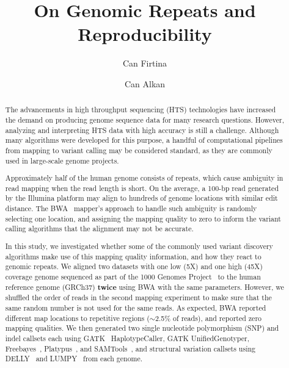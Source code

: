 \documentclass[a4paper]{article}
\date{}
\def\titulo#1{\title{#1}}
\begin{document}
\titulo{On Genomic Repeats and Reproducibility}

\author[1]{Can Firtina}
\author[1]{Can Alkan}

\maketitle
\thispagestyle{empty}


\begin{abstract}
The advancements in high throughput sequencing (HTS) technologies have increased the demand on producing  genome sequence data for many research questions. However, analyzing and interpreting HTS data with high accuracy is still a challenge. 
Although many algorithms were developed for this purpose, a handful of computational pipelines from mapping to variant calling may be considered standard, as they are commonly used in large-scale genome projects.

Approximately half of the human genome consists of repeats, which cause ambiguity in read mapping when the read length is short. On the average, a 100-bp read generated by the Illumina platform may align to hundreds of genome locations with similar edit distance. 
The BWA~\cite{Li2009a} mapper's  approach to handle such ambiguity is randomly selecting one location, and assigning the mapping quality to zero to inform the variant calling algorithms that the alignment may not be accurate. 

In this study, we investigated whether some of the commonly used variant discovery algorithms
make use of this mapping quality information, and how they react to genomic repeats.
We aligned two datasets with one low (5X) and one high (45X) coverage genome
sequenced as part of the 1000 Genomes Project~\cite{1000GP2012} to the human reference genome (GRCh37) {\bf twice} using BWA with the same parameters. However, we shuffled the order of reads in the second mapping experiment to make sure that the same random number is not used for the same reads.
As expected, BWA reported different map locations to repetitive regions ($\sim$2.5\% of reads), and reported zero mapping qualities. We then generated two single nucleotide polymorphism (SNP) and indel callsets each using GATK~\cite{DePristo2011} HaplotypeCaller, GATK UnifiedGenotyper, Freebayes~\cite{Garrison2012}, Platypus~\cite{Rimmer2014}, and SAMTools~\cite{Li2009b}, and structural variation
callsets using DELLY~\cite{Rausch2012} and LUMPY~\cite{Layer2014} from each genome.


\end{abstract}
\end{document}
